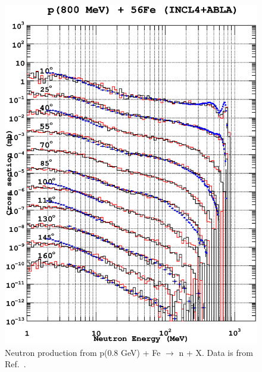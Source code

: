 \documentclass[a4paper]{jpconf}
\begin{document}
\begin{figure}
\begin{center}
\includegraphics[scale=0.70]{poster/images/iron.eps}
\caption{\label{fig:neutron08Fe}Neutron production from p(0.8 GeV) + Fe  $\rightarrow$ n + X. 
Data is from Ref.~\cite{data}.}
\end{center}

\end{figure}
\end{document}
